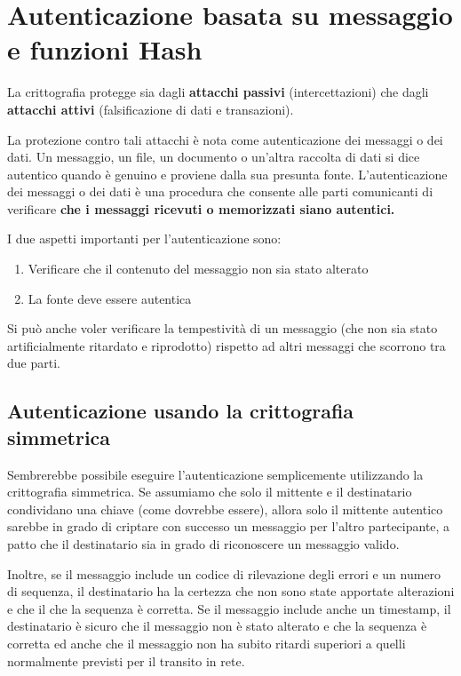 \section{Autenticazione basata su messaggio e funzioni Hash}
La crittografia protegge sia dagli \textbf{attacchi passivi} (intercettazioni) che dagli \textbf{attacchi attivi} (falsificazione di dati e transazioni). 

\singlespacing

La protezione contro tali attacchi è nota come autenticazione dei messaggi o dei dati. Un messaggio, un file, un documento o un'altra raccolta di dati si dice autentico quando è genuino e proviene dalla sua presunta fonte. L'autenticazione dei messaggi o dei dati è una procedura che consente alle parti comunicanti di verificare \textbf{che i messaggi ricevuti o memorizzati siano autentici.}

\singlespacing

I due aspetti importanti per l'autenticazione sono:

\begin{enumerate}
    \item Verificare che il contenuto del messaggio non sia stato alterato 
    
    \item La fonte deve essere autentica
\end{enumerate}

Si può anche voler verificare la tempestività di un messaggio (che non sia stato artificialmente ritardato e riprodotto) rispetto ad altri messaggi che scorrono tra due parti.

\subsection{Autenticazione usando la crittografia simmetrica}

Sembrerebbe possibile eseguire l'autenticazione semplicemente utilizzando la crittografia simmetrica. Se assumiamo che solo il mittente e il destinatario condividano una chiave (come dovrebbe essere), allora solo il mittente autentico sarebbe in grado di criptare con successo un messaggio per l'altro partecipante, a patto che il destinatario sia in grado di riconoscere un messaggio valido. 

\singlespacing

Inoltre, se il messaggio include un codice di rilevazione degli errori e un numero di sequenza, il destinatario ha la certezza che non sono state apportate alterazioni e che il che la sequenza è corretta. Se il messaggio include anche un timestamp, il destinatario è sicuro che il messaggio non è stato alterato e che la sequenza è corretta ed anche che il messaggio non ha subito ritardi superiori a quelli normalmente previsti per il transito in rete. 

